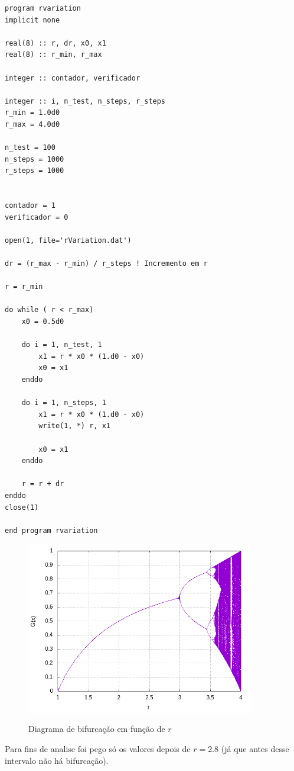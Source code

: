 \documentclass[a4paper, 12pt]{article}
\begin{document}
\begin{lstlisting}
program rvariation
implicit none

real(8) :: r, dr, x0, x1
real(8) :: r_min, r_max

integer :: contador, verificador

integer :: i, n_test, n_steps, r_steps
r_min = 1.0d0
r_max = 4.0d0

n_test = 100
n_steps = 1000
r_steps = 1000


contador = 1
verificador = 0

open(1, file='rVariation.dat')

dr = (r_max - r_min) / r_steps ! Incremento em r

r = r_min

do while ( r < r_max)
	x0 = 0.5d0
	
	do i = 1, n_test, 1
		x1 = r * x0 * (1.d0 - x0)
		x0 = x1
	enddo
	
	do i = 1, n_steps, 1
		x1 = r * x0 * (1.d0 - x0)
		write(1, *) r, x1
	
		x0 = x1
	enddo
	
	r = r + dr
enddo
close(1)

end program rvariation

\end{lstlisting}


\begin{figure}[H]
	\centering
	\caption{Diagrama de bifurcação em função de $r$}{}
	\includegraphics[width=10.0cm]{lambda.png}
	\label{fig:firstlambda}
\end{figure}
 

Para fins de analise foi pego só os valores depois de $ r = 2.8$ (já que antes desse intervalo não há bifurcação).
 
\end{document}
